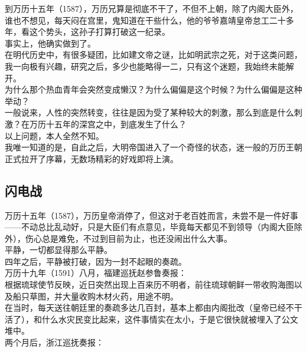 \begin{multicols}{\theparacolNo}
到万历十五年（1587），万历兄算是彻底不干了，不但不上朝，除了内阁大臣外，谁也不想见，每天闷在宫里，鬼知道在干些什么，他的爷爷嘉靖皇帝怠工二十多年，看这个势头，这孙子打算打破这一纪录。\\

事实上，他确实做到了。\\

在明代历史中，有很多疑团，比如建文帝之谜，比如明武宗之死，对于这类问题，我一向极有兴趣，研究之后，多少也能略得一二，只有这个迷题，我始终未能解开。\\

为什么那个热血青年会突然变成懒汉？为什么偏偏是这个时候？为什么偏偏是这种举动？\\

一般说来，人性的突然转变，往往是因为受了某种较大的刺激，那么到底是什么刺激？在万历十五年的深宫之中，到底发生了什么？\\

以上问题，本人全然不知。\\

我唯一知道的是，自此之后，大明帝国进入了一个奇怪的状态，迷一般的万历王朝正式拉开了序幕，无数场精彩的好戏即将上演。\\

\subsection{闪电战}
万历十五年（1587），万历皇帝消停了，但这对于老百姓而言，未尝不是一件好事——不动总比乱动好，只是大臣们有点意见，毕竟每天都见不到领导（内阁大臣除外），伤心总是难免，不过到目前为止，也还没闹出什么大事。\\

平静，一切都显得那么平静。\\

四年之后，平静被打破，因为一封不起眼的奏疏。\\

万历十九年（1591）八月，福建巡抚赵参鲁奏报：\\

根据琉球使节反映，近日突然出现上百来历不明者，前往琉球朝鲜一带收购海图以及船只草图，并大量收购木材火药，用途不明。\\

在当时，每天送往朝廷里的奏疏多达几百封，基本上都由内阁批改（皇帝已经不干活了），和什么水灾民变比起来，这件事情实在太小，于是它很快就被埋入了公文堆中。\\

两个月后，浙江巡抚奏报：\\


\end{multicols}
